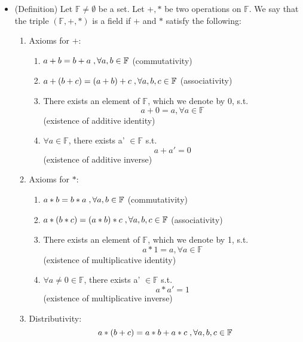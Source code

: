 \documentclass{article}
\begin{document}
\begin{itemize}
    \item (Definition) Let $\mathbb{F} \neq \emptyset$ be a set. Let $+,*$ be two operations on $\mathbb{F}$. We say that the triple $(\mathbb{F},+,*)$ is a field if $+$ and $*$ satisfy the following:
        \begin{enumerate}
            \item Axioms for $+$:
            \begin{enumerate}
                \item $a+b = b+a \hspace{0.1cm}, \forall a,b \in \mathbb{F}$ (commutativity)
                \item $a+(b+c) = (a+b)+c \hspace{0.1cm}, \forall a,b,c \in \mathbb{F}$ (associativity)
                \item There exists an element of $\mathbb{F}$, which we denote by 0, s.t. $$a+0 = a, \forall a \in \mathbb{F}$$ (existence of additive identity)
                \item $\forall a \in \mathbb{F}$, there exists a' $\in \mathbb{F}$ s.t. $$a+a' = 0$$ (existence of additive inverse)
            \end{enumerate}
            \item Axioms for $*$:
            \begin{enumerate}
                 \item $a*b = b*a \hspace{0.1cm}, \forall a,b \in \mathbb{F}$ (commutativity)
                \item $a*(b*c) = (a*b)*c \hspace{0.1cm}, \forall a,b,c \in \mathbb{F}$ (associativity)
                \item There exists an element of $\mathbb{F}$, which we denote by 1, s.t. $$a*1 = a, \forall a \in \mathbb{F}$$ (existence of multiplicative identity)
                \item $\forall a \neq 0 \in \mathbb{F}$, there exists a' $\in \mathbb{F}$ s.t. $$a*a' = 1$$ (existence of multiplicative inverse)
            \end{enumerate}
            \item Distributivity: $$ a*(b+c) = a*b + a*c \hspace{0.1cm} , \forall a,b,c \in \mathbb{F}$$
            
            
            
        \end{enumerate}
        

\end{itemize}
\end{document}
